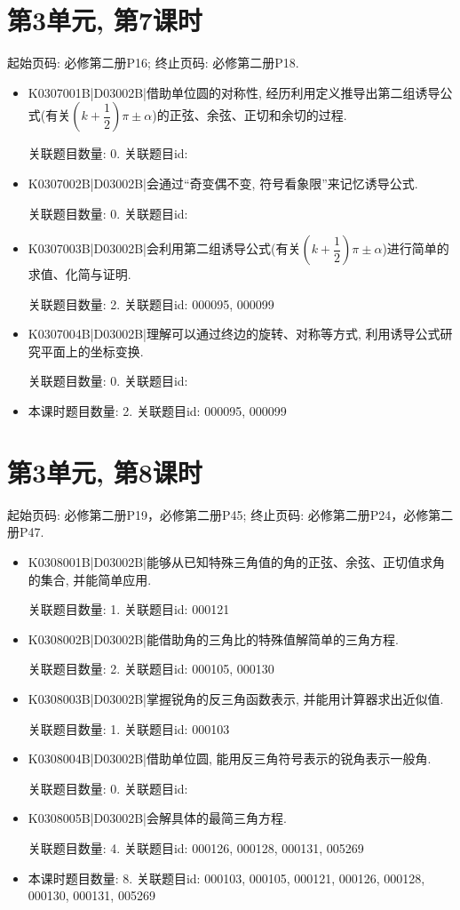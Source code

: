 \section*{第3单元, 第7课时}
起始页码: 必修第二册P16; 终止页码: 必修第二册P18.
\begin{itemize}
\item K0307001B|D03002B|借助单位圆的对称性, 经历利用定义推导出第二组诱导公式(有关$(k+\dfrac 12)\pi\pm \alpha$)的正弦、余弦、正切和余切的过程.

关联题目数量: 0. 关联题目id: 

\item K0307002B|D03002B|会通过``奇变偶不变, 符号看象限''来记忆诱导公式.

关联题目数量: 0. 关联题目id: 

\item K0307003B|D03002B|会利用第二组诱导公式(有关$(k+\dfrac 12)\pi\pm \alpha$)进行简单的求值、化简与证明.

关联题目数量: 2. 关联题目id: 000095, 000099

\item K0307004B|D03002B|理解可以通过终边的旋转、对称等方式, 利用诱导公式研究平面上的坐标变换.

关联题目数量: 0. 关联题目id: 

\item 本课时题目数量: 2. 关联题目id: 000095, 000099

\end{itemize}

\section*{第3单元, 第8课时}
起始页码: 必修第二册P19，必修第二册P45; 终止页码: 必修第二册P24，必修第二册P47.
\begin{itemize}
\item K0308001B|D03002B|能够从已知特殊三角值的角的正弦、余弦、正切值求角的集合, 并能简单应用.

关联题目数量: 1. 关联题目id: 000121

\item K0308002B|D03002B|能借助角的三角比的特殊值解简单的三角方程.

关联题目数量: 2. 关联题目id: 000105, 000130

\item K0308003B|D03002B|掌握锐角的反三角函数表示, 并能用计算器求出近似值.

关联题目数量: 1. 关联题目id: 000103

\item K0308004B|D03002B|借助单位圆, 能用反三角符号表示的锐角表示一般角.

关联题目数量: 0. 关联题目id: 

\item K0308005B|D03002B|会解具体的最简三角方程.

关联题目数量: 4. 关联题目id: 000126, 000128, 000131, 005269

\item 本课时题目数量: 8. 关联题目id: 000103, 000105, 000121, 000126, 000128, 000130, 000131, 005269

\end{itemize}

